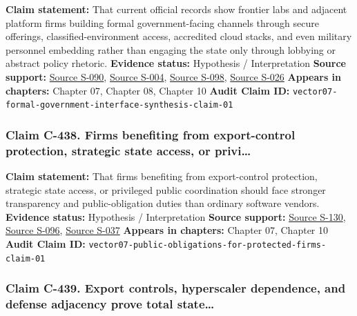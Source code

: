 \documentclass[
  american,
  11pt,
  letterpaper,
]{article}
\begin{document}
\textbf{Claim statement:} That current official records show frontier
labs and adjacent platform firms building formal government-facing
channels through secure offerings, classified-environment access,
accredited cloud stacks, and even military personnel embedding rather
than engaging the state only through lobbying or abstract policy
rhetoric. \textbf{Evidence status:} Hypothesis / Interpretation
\textbf{Source support:}
\hyperref[source-s-090-introducing-openai-for-government]{Source S-090},
\hyperref[source-s-004-claude-gov-models-for-u-s-national-security-customers]{Source
S-004},
\hyperref[source-s-098-anthropic-and-palantir-partner-to-bring-claude-ai-models-to-aws-for-u-s-government-intelligence-and-defense-operations]{Source
S-098},
\hyperref[source-s-026-army-launches-detachment-201-executive-innovation-corps-to-drive-tech-transformation]{Source
S-026} \textbf{Appears in chapters:} Chapter 07, Chapter 08, Chapter 10
\textbf{Audit Claim ID:}
\texttt{vector07-formal-government-interface-synthesis-claim-01}

\subsubsection{Claim C-438. Firms benefiting from export-control
protection, strategic state access, or
privi\ldots{}}\label{claim-c-438-firms-benefiting-from-export-control-protection-strategic-state-access-or-privi}

\textbf{Claim statement:} That firms benefiting from export-control
protection, strategic state access, or privileged public coordination
should face stronger transparency and public-obligation duties than
ordinary software vendors. \textbf{Evidence status:} Hypothesis /
Interpretation \textbf{Source support:}
\hyperref[source-s-130-removing-barriers-to-american-leadership-in-artificial-intelligence]{Source
S-130},
\hyperref[source-s-096-openais-proposals-for-the-us-ai-action-plan]{Source
S-096},
\hyperref[source-s-037-guidance-regarding-enforcement-of-license-requirements-for-advanced-computing-items-for-entities-headquartered-in-country-group-d-5-and-macau]{Source
S-037} \textbf{Appears in chapters:} Chapter 07, Chapter 10
\textbf{Audit Claim ID:}
\texttt{vector07-public-obligations-for-protected-firms-claim-01}

\subsubsection{Claim C-439. Export controls, hyperscaler dependence, and
defense adjacency prove total
state\ldots{}}\label{claim-c-439-export-controls-hyperscaler-dependence-and-defense-adjacency-prove-total-state}
\end{document}
